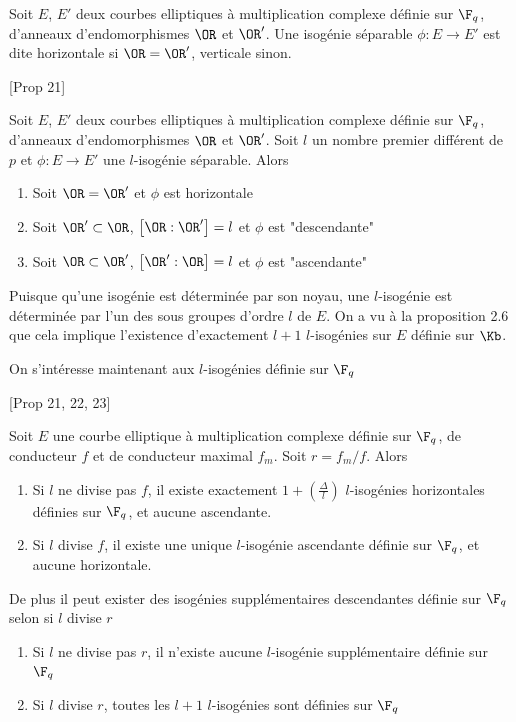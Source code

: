 \begin{Def}
	Soit $E$, $E'$ deux courbes elliptiques à multiplication complexe définie sur $\F_{q}$, d'anneaux d'endomorphismes $\OR$ et $\OR'$. Une isogénie séparable $\phi : E\rightarrow E'$ est dite horizontale si $\OR = \OR'$, verticale sinon.
\end{Def}

\begin{Prop}\cite{Kohel}[Prop 21]
	
	Soit $E$, $E'$ deux courbes elliptiques à multiplication complexe définie sur $\F_{q}$, d'anneaux d'endomorphismes $\OR$ et $\OR'$. Soit $l$ un nombre premier différent de $p$ et $\phi : E\rightarrow E'$ une $l$-isogénie séparable. Alors
	\begin{enumerate}
		\item Soit $\OR = \OR'$ et $\phi$ est horizontale
		\item Soit $\OR'\subset \OR$, $\left[ \OR : \OR' \right] = l$ et $\phi$ est "descendante"
		\item Soit $\OR\subset \OR'$, $\left[ \OR' : \OR \right] = l$ et $\phi$ est "ascendante" 
	\end{enumerate}
\end{Prop}

\begin{Rem}
	Puisque qu'une isogénie est déterminée par son noyau, une $l$-isogénie est déterminée par l'un des sous groupes d'ordre $l$ de $E$. On a vu à la proposition 2.6 que cela implique l'existence d'exactement $l+1$ $l$-isogénies sur $E$ définie sur $\Kb$. 
\end{Rem}

On s'intéresse maintenant aux $l$-isogénies définie sur $\F_{q}$

\begin{Prop}\cite{Kohel}[Prop 21, 22, 23]
	
	Soit $E$ une courbe elliptique à multiplication complexe définie sur $\F_{q}$, de conducteur $f$ et de conducteur maximal $f_{m}$. Soit
	$r = f_{m}/f$. Alors
	\begin{enumerate}
		\item Si $l$ ne divise pas $f$, il existe exactement $1 + \left( \frac{\Delta}{l}\right)$ $l$-isogénies horizontales définies sur $\F_{q}$, et aucune ascendante.
		\item Si $l$ divise $f$, il existe une unique $l$-isogénie ascendante définie sur $\F_{q}$, et aucune horizontale.
	\end{enumerate}
	De plus il peut exister des isogénies supplémentaires descendantes définie sur $\F_{q}$ selon si $l$ divise $r$ 
	\begin{enumerate}
		\item Si $l$ ne divise pas $r$, il n'existe aucune $l$-isogénie supplémentaire définie sur $\F_{q}$
		\item Si $l$ divise $r$, toutes les $l+1$ $l$-isogénies sont définies sur $\F_{q}$
	\end{enumerate}
	
\end{Prop}


